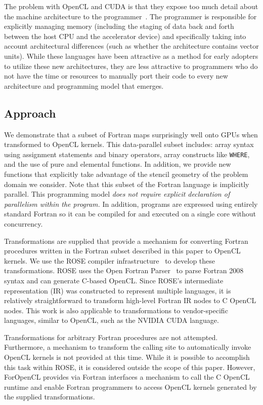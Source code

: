The problem with OpenCL and CUDA is that they expose too much detail
about the machine architecture to the programmer~\citep{wolfe08gpgpu}.
The programmer is responsible for explicitly managing memory
(including the staging of data back and forth between the host CPU and
the accelerator device) and specifically taking into account
architectural differences (such as whether the architecture contains
vector units).  While these languages have been attractive as a method
for early adopters to utilize these new architectures, they are less
attractive to programmers who do not have the time or resources to
manually port their code to every new architecture and programming
model that emerges.


\subsection{Approach}

We demonstrate that a subset of Fortran maps surprisingly well onto
GPUs when transformed to OpenCL kernels.  This data-parallel subset
includes: array syntax using assignment statements and binary
operators, array constructs like {\tt WHERE}, and the use of pure and
elemental functions.  In addition, we provide new functions that
explicitly take advantage of the stencil geometry of the problem
domain we consider.  Note that this subset of the Fortran language is
implicitly parallel.  This programming model \emph{does not require
  explicit declaration of parallelism within the program.}  In
addition, programs are expressed using entirely standard Fortran so it
can be compiled for and executed on a single core without concurrency.

Transformations are supplied that provide a mechanism for converting
Fortran procedures written in the Fortran subset described in this
paper to OpenCL kernels.  We use the ROSE compiler
infrastructure~\citep{rose-web} to develop these transformations.
ROSE uses the Open Fortran Parser~\citep{ofp:sf} to parse Fortran 2008
syntax and can generate C-based OpenCL.  Since ROSE's intermediate
representation (IR) was constructed to represent multiple languages,
it is relatively straightforward to transform high-level Fortran IR
nodes to C OpenCL nodes.  This work is also applicable to
transformations to vendor-specific languages, similar to OpenCL, such
as the NVIDIA CUDA language.

Transformations for arbitrary Fortran procedures are not attempted.
Furthermore, a mechanism to transform the calling site to
automatically invoke OpenCL kernels is not provided at this time.
While it is possible to accomplish this task within ROSE, it is
considered outside the scope of this paper.  However, ForOpenCL
provides via Fortran interfaces a mechanism to call the C OpenCL
runtime and enable Fortran programmers to access OpenCL kernels
generated by the supplied transformations.

